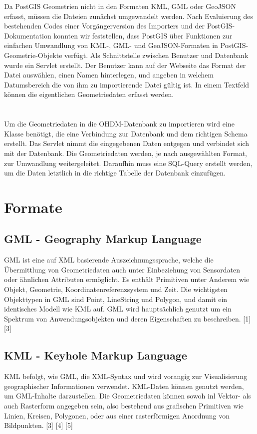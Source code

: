 \documentclass[]{article}
\begin{document}
Da PostGIS Geometrien nicht in den Formaten KML, GML oder GeoJSON erfasst, müssen die Dateien zunächst umgewandelt werden. Nach Evaluierung des bestehenden Codes einer Vorgängerversion des Importers und der PostGIS-Dokumentation konnten wir feststellen, dass PostGIS über Funktionen zur einfachen Umwandlung von KML-, GML- und GeoJSON-Formaten in PostGIS-Geometrie-Objekte verfügt. Als Schnittstelle zwischen Benutzer und Datenbank wurde ein Servlet erstellt. Der Benutzer kann auf der Webseite das Format der Datei auswählen, einen Namen hinterlegen, und angeben in welchem Datumsbereich die von ihm zu importierende Datei gültig ist. In einem Textfeld können die eigentlichen Geometriedaten erfasst werden.\\
\\
\\
Um die Geometriedaten in die OHDM-Datenbank zu importieren wird eine Klasse benötigt, die eine Verbindung zur Datenbank und dem richtigen Schema erstellt. Das Servlet nimmt die eingegebenen Daten entgegen und verbindet sich mit der Datenbank. Die Geometriedaten werden, je nach ausgewählten Format, zur Umwandlung weitergeleitet. Daraufhin muss eine SQL-Query erstellt werden, um die Daten letztlich in die richtige Tabelle der Datenbank einzufügen.

\section{Formate}
\subsection{GML - Geography Markup Language}
GML ist eine auf XML basierende Auszeichnungssprache, welche die Übermittlung von Geometriedaten auch unter Einbeziehung von Sensordaten oder ähnlichen Attributen ermöglicht. Es enthält Primitiven unter Anderem wie Objekt, Geometrie, Koordinatenreferenzsystem und Zeit. Die wichtigsten Objekttypen in GML sind Point, LineString und Polygon, und damit ein identisches Modell wie KML auf. GML wird hauptsächlich genutzt um ein Spektrum von Anwendungsobjekten und deren Eigenschaften zu beschreiben. [1] [3]

\subsection{KML - Keyhole Markup Language}
KML befolgt, wie GML, die XML-Syntax und wird vorangig zur Visualisierung geographischer Informationen verwendet. KML-Daten können genutzt werden, um GML-Inhalte darzustellen. Die Geometriedaten können sowoh inl Vektor- als auch Rasterform angegeben sein, also bestehend aus grafischen Primitiven wie Linien, Kreisen, Polygonen, oder aus einer rasterförmigen Anordnung von Bildpunkten. [3] [4] [5]
\end{document}

